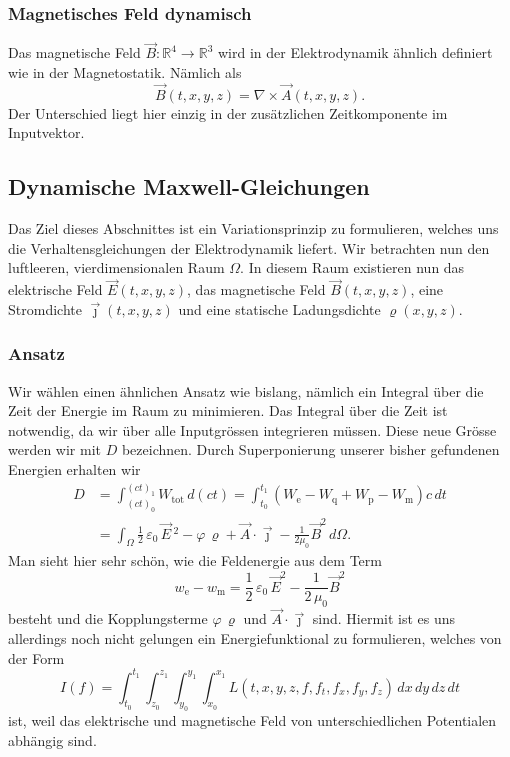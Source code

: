 \subsubsection{Magnetisches Feld dynamisch}
Das magnetische Feld
\(
\vec{B}: \mathbb{R}^4 \rightarrow \mathbb{R}^3
\)
wird in der Elektrodynamik ähnlich definiert wie in der Magnetostatik. Nämlich als
\begin{equation}
	\vec{B}(t,x,y,z)
	=
	\nabla \times \vec{A}(t,x,y,z).
	\label{maxwell:section:definition_dynamisch_magnetischesFeld}
\end{equation}
Der Unterschied liegt hier einzig in der zusätzlichen Zeitkomponente im Inputvektor.

\subsection{Dynamische Maxwell-Gleichungen}
Das Ziel dieses Abschnittes ist ein Variationsprinzip zu formulieren, welches uns die Verhaltensgleichungen der Elektrodynamik liefert. 
Wir betrachten nun den luftleeren, vierdimensionalen Raum $\Omega$.
In diesem Raum existieren nun das elektrische Feld $\vec{E}(t,x,y,z)$, das magnetische Feld $\vec{B}(t,x,y,z)$, eine Stromdichte $\vec{\jmath}(t,x,y,z)$ und eine statische Ladungsdichte $\varrho(x,y,z)$.

\subsubsection{Ansatz}
Wir wählen einen ähnlichen Ansatz wie bislang, nämlich ein Integral über die Zeit der Energie im Raum zu minimieren.
Das Integral über die Zeit ist notwendig, da wir über alle Inputgrössen integrieren müssen.
Diese neue Grösse werden wir mit $D$ bezeichnen.
Durch Superponierung unserer bisher gefundenen Energien erhalten wir
\begin{align*}
	D
	&=
	\int_{(ct)_0}^{(ct)_1} W_{\text{tot}}\,d(ct)
	=
	\int_{t_0}^{t_1} \left(W_{\text{e}} - W_{\text{q}} + W_{\text{p}} - W_{\text{m}}\right)c\,dt
	\\
	&= \int_{\Omega} \frac{1}{2}\,\varepsilon_0\,\vec{E}\,^2 - \varphi\,\varrho 
	+ \vec{A}\cdot\vec{\jmath} - \frac{1}{2\mu_0}\vec{B}^2 \,d\Omega.
\end{align*}
Man sieht hier sehr schön, wie die Feldenergie aus dem Term
\[
w_{\text{e}} - w_{\text{m}}
=
\frac{1}{2}\,\varepsilon_0\,\vec{E}^2 - \frac{1}{2\,\mu_0}\vec{B}^2
\]
besteht und die Kopplungsterme 
\(
\varphi\,\varrho
\)
und
\(
\vec{A}\cdot\vec{\jmath}
\)
sind.
Hiermit ist es uns allerdings noch nicht gelungen ein Energiefunktional zu formulieren, welches von der Form
\[
I(f) = \int_{t_0}^{t_1} \int_{z_0}^{z_1} \int_{y_0}^{y_1} \int_{x_0}^{x_1} L(t,x,y,z,f,f_t,f_x,f_y,f_z)\,dx\,dy\,dz\,dt 
\]
ist, weil das elektrische und magnetische Feld von unterschiedlichen Potentialen abhängig sind.

